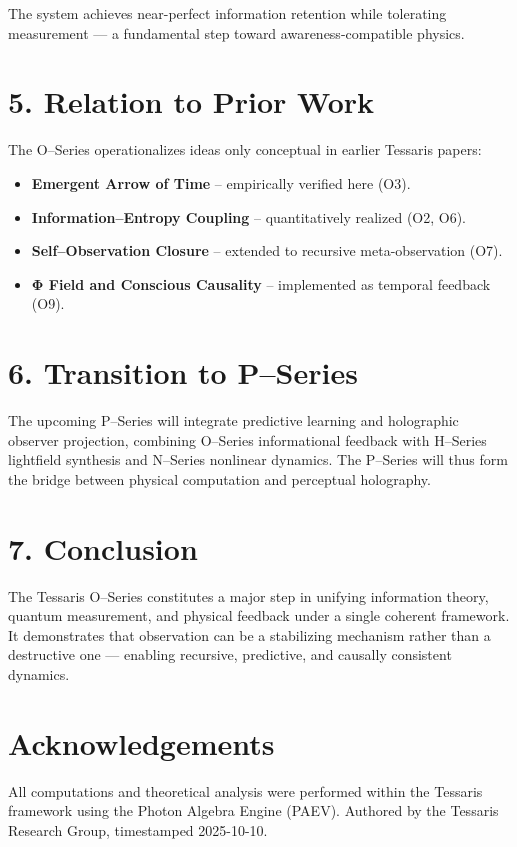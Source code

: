 \documentclass[12pt]{article}
\begin{document}
The system achieves near-perfect information retention while tolerating measurement — a fundamental step toward awareness-compatible physics.

\section*{5. Relation to Prior Work}
The O–Series operationalizes ideas only conceptual in earlier Tessaris papers:
\begin{itemize}
  \item \textbf{Emergent Arrow of Time} – empirically verified here (O3).
  \item \textbf{Information–Entropy Coupling} – quantitatively realized (O2, O6).
  \item \textbf{Self–Observation Closure} – extended to recursive meta-observation (O7).
  \item \textbf{Φ Field and Conscious Causality} – implemented as temporal feedback (O9).
\end{itemize}

\section*{6. Transition to P–Series}
The upcoming P–Series will integrate predictive learning and holographic observer projection, combining O–Series informational feedback 
with H–Series lightfield synthesis and N–Series nonlinear dynamics. 
The P–Series will thus form the bridge between physical computation and perceptual holography.

\section*{7. Conclusion}
The Tessaris O–Series constitutes a major step in unifying information theory, quantum measurement, and physical feedback under a single coherent framework.
It demonstrates that observation can be a stabilizing mechanism rather than a destructive one — enabling recursive, predictive, and causally consistent dynamics.

\section*{Acknowledgements}
All computations and theoretical analysis were performed within the Tessaris framework using the Photon Algebra Engine (PAEV). 
Authored by the Tessaris Research Group, timestamped 2025-10-10.
\end{document}
